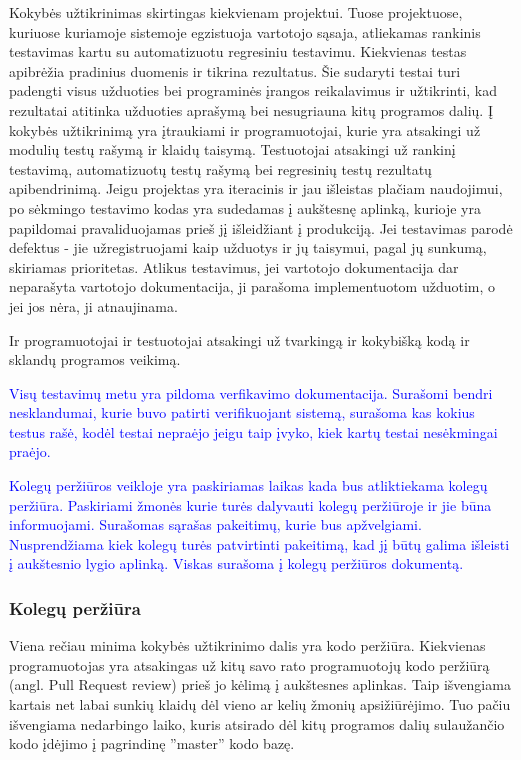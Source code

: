 \documentclass{VUMIFPSkursinis}
\begin{document}
	Kokybės užtikrinimas skirtingas kiekvienam projektui.
	Tuose projektuose, kuriuose kuriamoje sistemoje egzistuoja vartotojo sąsaja, atliekamas rankinis testavimas kartu su automatizuotu regresiniu testavimu. Kiekvienas testas apibrėžia pradinius duomenis ir tikrina rezultatus. Šie sudaryti testai turi padengti visus užduoties bei programinės įrangos reikalavimus ir užtikrinti, kad rezultatai atitinka užduoties aprašymą bei nesugriauna kitų programos dalių.
	Į kokybės užtikrinimą yra įtraukiami ir programuotojai, kurie yra atsakingi už modulių testų rašymą ir klaidų taisymą.
	Testuotojai atsakingi už rankinį testavimą, automatizuotų testų rašymą bei regresinių testų rezultatų apibendrinimą.
	Jeigu projektas yra iteracinis ir jau išleistas plačiam naudojimui, po sėkmingo testavimo kodas yra sudedamas į aukštesnę aplinką, kurioje yra papildomai pravaliduojamas prieš jį išleidžiant į produkciją.
	Jei testavimas parodė defektus - jie užregistruojami kaip užduotys ir jų taisymui, pagal jų sunkumą, skiriamas prioritetas. 
Atlikus testavimus, jei vartotojo dokumentacija dar neparašyta vartotojo dokumentacija, ji parašoma implementuotom užduotim, o jei jos nėra, ji atnaujinama.
	\par
	Ir programuotojai ir testuotojai atsakingi už tvarkingą ir kokybišką kodą ir sklandų programos veikimą.

	\textcolor{blue}{Visų testavimų metu yra pildoma verfikavimo dokumentacija. 
				Surašomi bendri nesklandumai, kurie buvo patirti verifikuojant sistemą, surašoma kas kokius testus rašė, kodėl testai nepraėjo jeigu taip įvyko, kiek kartų testai nesėkmingai praėjo.}
	
	\textcolor{blue}{Kolegų peržiūros veikloje yra paskiriamas laikas kada bus atliktiekama kolegų peržiūra.
				Paskiriami žmonės kurie turės dalyvauti kolegų peržiūroje ir jie būna informuojami.
				Surašomas sąrašas pakeitimų, kurie bus apžvelgiami.
				Nusprendžiama kiek kolegų turės patvirtinti pakeitimą, kad jį būtų galima išleisti į aukštesnio lygio aplinką.
				Viskas surašoma į kolegų peržiūros dokumentą.}

	\newpage
	\subsubsection{Kolegų peržiūra}
	Viena rečiau minima kokybės užtikrinimo dalis yra kodo peržiūra.
	Kiekvienas programuotojas yra atsakingas už kitų savo rato programuotojų kodo peržiūrą (angl. Pull Request review) prieš jo kėlimą į aukštesnes aplinkas.
	Taip išvengiama kartais net labai sunkių klaidų dėl vieno ar kelių žmonių apsižiūrėjimo.
	Tuo pačiu išvengiama nedarbingo laiko, kuris atsirado dėl kitų programos dalių sulaužančio kodo įdėjimo į pagrindinę ''master'' kodo bazę.
\end{document}
